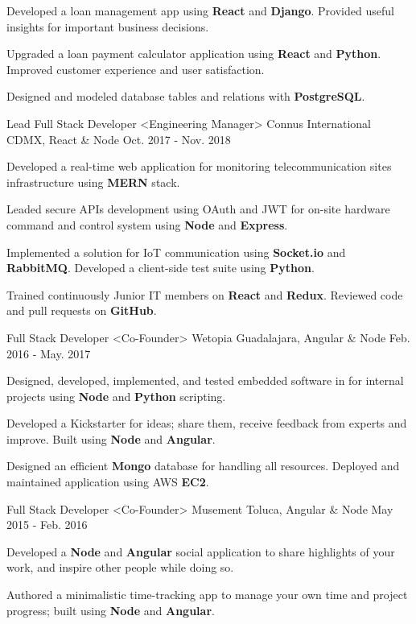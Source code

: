 \begin{cventries}
{\begin{cvitems}
        \item {Developed a loan management app using \textbf{React} and \textbf{Django}. Provided useful insights for important business decisions.}
        \item {Upgraded a loan payment calculator application using \textbf{React} and \textbf{Python}. Improved customer experience and user satisfaction.}
        \item {Designed and modeled database tables and relations with \textbf{PostgreSQL}.}
      \end{cvitems}
    }
  \cventry
    {Lead Full Stack Developer <Engineering Manager>}
    {Connus International}
    {CDMX, React \& Node}
    {Oct. 2017 - Nov. 2018}
    {
      \begin{cvitems}
        \item {Developed a real-time web application for monitoring telecommunication sites infrastructure using \textbf{MERN} stack.}
        \item {Leaded secure APIs development using OAuth and JWT for on-site hardware command and control system using \textbf{Node} and \textbf{Express}.}
        \item {Implemented a solution for IoT communication using \textbf{Socket.io} and \textbf{RabbitMQ}. Developed a client-side test suite using \textbf{Python}.}
        \item {Trained continuously Junior IT members on \textbf{React} and \textbf{Redux}. Reviewed code and pull requests on \textbf{GitHub}.}
      \end{cvitems}
    }
    \cventry
      {Full Stack Developer <Co-Founder>}
      {Wetopia}
      {Guadalajara, Angular \& Node}
      {Feb. 2016 - May. 2017}
      {
        \begin{cvitems}
          \item{Designed, developed, implemented, and tested embedded software in for internal projects using \textbf{Node} and \textbf{Python} scripting.}
          \item {Developed a Kickstarter for ideas; share them, receive feedback from experts and improve. Built using \textbf{Node} and \textbf{Angular}.}
          \item {Designed an efficient \textbf{Mongo} database for handling all resources. Deployed and maintained application using AWS \textbf{EC2}.}
        \end{cvitems}
      }
      \cventry
        {Full Stack Developer <Co-Founder>}
        {Musement}
        {Toluca, Angular \& Node}
        {May 2015 - Feb. 2016}
        {
          \begin{cvitems}
            \item {Developed a \textbf{Node} and \textbf{Angular} social application to share highlights of your work, and inspire other people while doing so.}
            \item {Authored a minimalistic time-tracking app to manage your own time and project progress; built using \textbf{Node} and \textbf{Angular}.}
          \end{cvitems}
        }
  \end{cventries}
